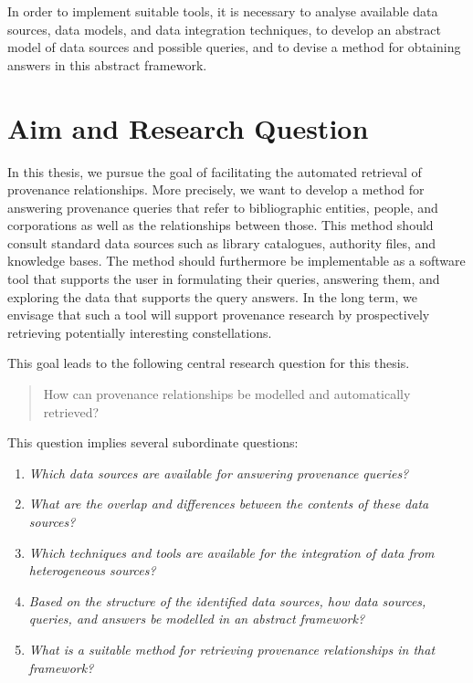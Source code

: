 In order to implement suitable tools,
it is necessary to analyse available data sources, data models, and data integration techniques,
to develop an abstract model of data sources and possible queries,
and to devise a method for obtaining answers in this abstract framework.

\section{Aim and Research Question}
\label{sec:research_questions}

In this thesis, we pursue the goal of facilitating
the automated retrieval of provenance relationships.
More precisely,
we want to develop a method for answering provenance queries that refer to bibliographic entities, people, and corporations
as well as the relationships between those. This method should consult standard data sources such as 
library catalogues, authority files, and knowledge bases. The method should furthermore be implementable as a software tool
that supports the user in formulating their queries, answering them, and exploring the data that supports the query answers.
In the long term, we envisage that such a tool will support provenance research
by prospectively retrieving potentially interesting constellations.

This goal leads to the following
central research question for this thesis.
%
\begin{quote}
  \begin{itshape}
    How can provenance relationships be modelled and automatically retrieved?
  \end{itshape}
\end{quote}
%  
This question implies several subordinate questions:
%
\begin{enumerate}
  \item[\subquestion{1}]
    \emph{Which data sources are available for answering provenance queries?}
  \item[\subquestion{2}]
    \emph{What are the overlap and differences between the contents of these data sources?}
  \item[\subquestion{3}]
    \emph{Which techniques and tools are available for the integration
    of data from heterogeneous sources?}
  \item[\subquestion{4}]
    \emph{Based on the structure of the identified data sources,
    how data sources, queries, and answers be modelled in an abstract framework?}
  \item[\subquestion{5}]
    \emph{What is a suitable method for retrieving provenance relationships
    in that framework?}
\end{enumerate}


